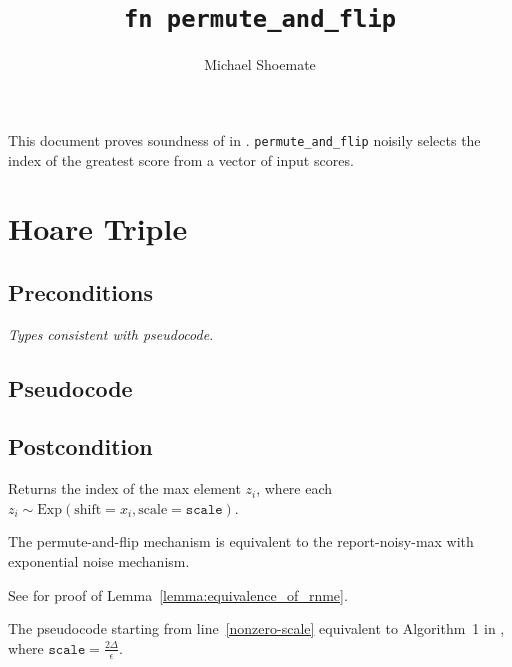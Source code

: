 \documentclass{article}
\title{\texttt{fn permute\_and\_flip}}
\author{Michael Shoemate}
\begin{document}
\maketitle\contrib
This document proves soundness of  \cite{mckenna2020permute} in . 
\texttt{permute\_and\_flip} noisily selects the index of the greatest score from a vector of input scores.

\section{Hoare Triple}
\subsection*{Preconditions}
\textit{Types consistent with pseudocode.}

\subsection*{Pseudocode}
\label{sec:python-pseudocode}


\subsection*{Postcondition}
\begin{theorem}
    \label{postcondition}
    Returns the index of the max element $z_i$,
    where each $z_i \sim \mathrm{Exp}(\mathrm{shift}=x_i, \mathrm{scale}=\texttt{scale})$.
\end{theorem}

\begin{lemma}
    \label{lemma:equivalence_of_rnme}
    The permute-and-flip mechanism is equivalent to the report-noisy-max with exponential noise mechanism. 
\end{lemma}
See \cite{ding2021permute} for proof of Lemma~\ref{lemma:equivalence_of_rnme}.

\begin{lemma}
    \label{lemma:algorithm1}
    The pseudocode starting from line~\ref{nonzero-scale} equivalent to Algorithm~1 in \cite{mckenna2020permute},
    where $\texttt{scale} = \frac{2\Delta}{\epsilon}$.
\end{lemma}
\end{document}
